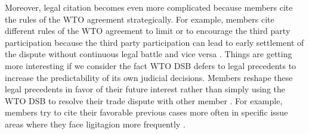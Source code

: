 Moreover, legal citation becomes even more complicated because members cite the
rules of the WTO agreement strategically. For example,
members cite different rules of the WTO agreement to limit or to encourage
the third party participation because the third party
participation can lead to early settlement of the dispute without continuous
legal battle and vice versa  \cite{who_gets}. Things are getting more interesting if we consider the fact WTO DSB defers to legal precedents to increase the predictability of its own judicial decisions.
Members reshape these legal precedents in favor of their future interest rather than simply using the WTO DSB to resolve their trade dispute with other member \citep{pelc}.
For example, members try to cite their favorable previous cases more often in specific issue areas where they face ligitagion more frequently \citep{latent}.

